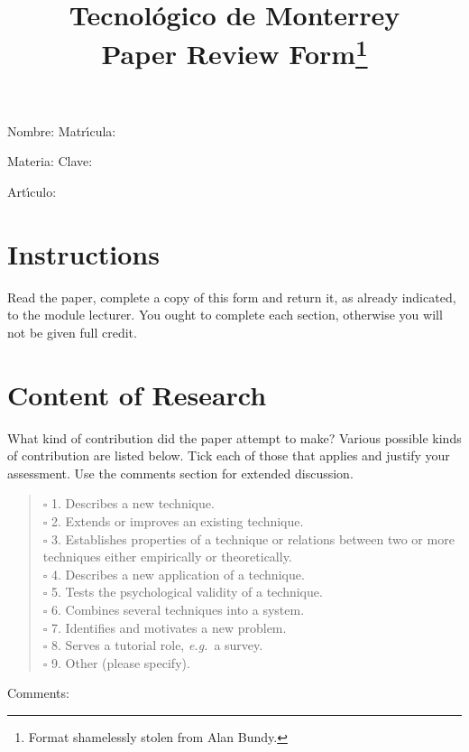 \documentclass{article}
\title{Tecnol\'ogico de Monterrey\\
Paper Review Form\thanks{
Format shamelessly stolen from Alan Bundy.}}
\author{}
\date{}
\begin{document}
\maketitle
\vspace{-2cm}

\begin{description}
\item Nombre:  \hspace{1in} Matr\'{\i}cula: 
\item Materia:  \hspace{1in} Clave: 
\item Art\'{\i}culo: 
\end{description}

\section*{Instructions} 

{\small Read the paper, complete a copy of this form and return it,
as already indicated, to the module lecturer. You ought to complete each 
section, otherwise you will not be given full credit.}

\section{Content of Research}
{\small What kind of contribution did the paper attempt to make?
Various possible kinds of contribution are listed below.  Tick
each of those that applies and justify your assessment. Use the
comments section for extended discussion.}
\begin{verse}



$\square$
1. Describes a new technique.  \\
$\square$
2. Extends or improves an existing technique.  \\
$\square$
3. Establishes properties of a technique or relations between two
or more techniques either empirically or theoretically.  \\
$\square$
4. Describes a new application of a technique.  \\
$\square$
5. Tests the psychological validity of a technique.  \\
$\square$
6. Combines several techniques into a system.  \\
$\square$
7. Identifies and motivates a new problem.  \\
$\square$
8. Serves a tutorial role, {\em e.g.}~a survey.  \\
$\square$
9. Other (please specify).  \\
\end{verse}
Comments: \\
\boxed{}
\end{document}

